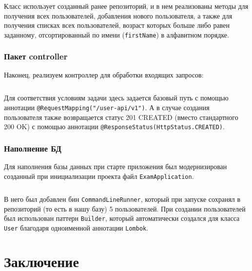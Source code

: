 \documentclass[a4paper, 14pt]{article}
\begin{document}
\normalsize
\inputminted[frame=single]{Java}{../src/main/java/ru/vspochernin/exam/service/UserService.java}
\large

Класс использует созданный ранее репозиторий, и в нем реализованы методы для получения всех пользователей, добавления нового пользователя, а также для получения списках всех пользователей, возраст которых больше либо равен заданному, отсортированный по имени (\texttt{firstName}) в алфавитном порядке.

\subsubsection{Пакет controller}

Наконец, реализуем контроллер для обработки входящих запросов:

\normalsize
\inputminted[frame=single]{Java}{../src/main/java/ru/vspochernin/exam/controller/UserController.java}
\large

Для соответствия условиям задачи здесь задается базовый путь с помощью аннотации \texttt{@RequestMapping("/user-api/v1")}. А в случае создания пользователя также возвращается статус 201 CREATED (вместо стандартного 200 OK) с помощью аннотации \texttt{@ResponseStatus(HttpStatus.CREATED)}.

\subsubsection{Наполнение БД}

Для наполнения базы данных при старте приложения был модернизирован созданный при инициализации проекта файл \texttt{ExamApplication}.

\normalsize
\inputminted[frame=single]{Java}{../src/main/java/ru/vspochernin/exam/ExamApplication.java}
\large

В него был добавлен бин \texttt{CommandLineRunner}, который при запуске сохранял в репозиторий (то есть в нашу базу) 5 пользователей. При создании пользователей был использован паттерн \texttt{Builder}, который автоматически создался для класса \texttt{User} благодаря одноименной аннотации \texttt{Lombok}.


\newpage
\section{Заключение}
\end{document}

